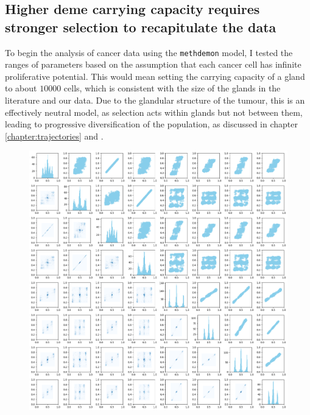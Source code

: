 \subsection{Higher deme carrying capacity requires stronger selection to
recapitulate the data}
To begin the analysis of cancer data using the \texttt{methdemon} model, I tested the
ranges of parameters based on the assumption that each cancer cell has infinite
proliferative potential. This would mean setting the carrying capacity of a gland
to about $10000$ cells, which is consistent with the size of the glands in the
literature \cite{sottoriva_big_2015} and our data. Due to the glandular
structure of the tumour, this is an effectively neutral model, as selection
acts within glands but not between them, leading to progressive diversification
of the population, as discussed in chapter \ref{chapter:trajectories} and
\cite{noble_spatial_2022}.\par

\begin{figure}[h]
    \centering
    \includegraphics[width=\textwidth]{Chapter_5/figures/10000plot.png}
    \caption{}
    \label{fig:methdemon_weak_selection}
\end{figure}

